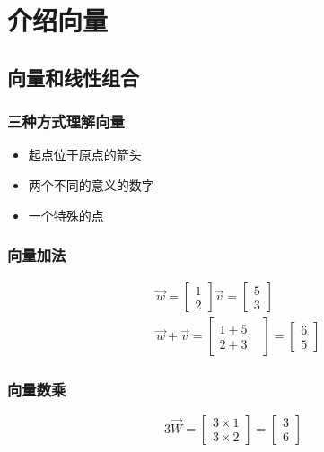 \chapter{介绍向量}

\section{向量和线性组合}

\subsection{三种方式理解向量}
\begin{itemize}
    \item 起点位于原点的箭头
    \item 两个不同的意义的数字
    \item 一个特殊的点
\end{itemize}

\subsection{向量加法}
\begin{align}
&\overrightarrow{w}=\left[\begin{matrix}1\\2\end{matrix}\right]
\overrightarrow{v}=\left[\begin{matrix}5\\3\end{matrix}\right]\\
&\overrightarrow{w}+\overrightarrow{v}=\left[\begin{matrix}1+5&\\2+3&\end{matrix}\right]=\left[\begin{matrix}6\\5\end{matrix}\right]
\end{align}

\subsection{向量数乘}
\[3\overrightarrow{W}=[\begin{matrix}3\times1\\3\times2\end{matrix}]=[\begin{matrix}3\\6\end{matrix}]\]

\begin{comment}
    三种向量的理解方式
    向量加法
    向量数乘
    线性相关
    张成的空间
\end{comment}
